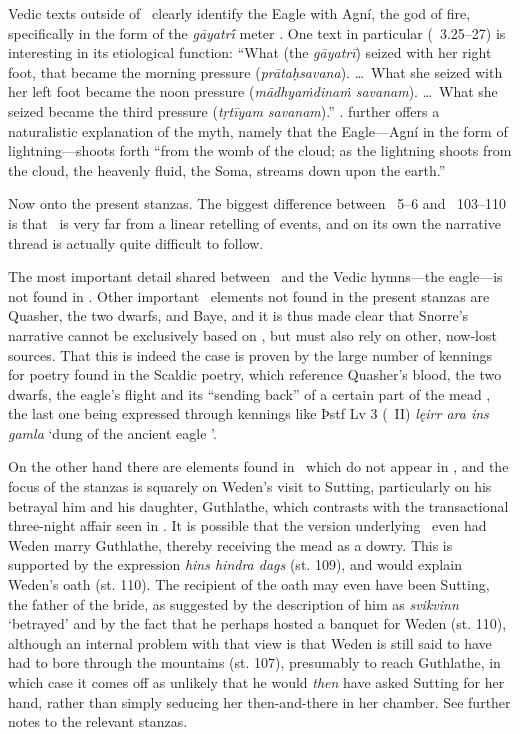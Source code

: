 Vedic texts outside of \Rigveda\ clearly identify the Eagle with Agní, the god of fire, specifically in the form of the \emph{gāyatrī́} meter \parencite{Bloomfield1896}.  One text in particular (\AitareyaBrahmana\ 3.25–27) is interesting in its etiological function: “What (the \emph{gāyatrī}) seized with her right foot, that became the morning pressure (\emph{prātaḥsavana}). \dots\ What she seized with her left foot became the noon pressure (\emph{mādhyaṁdinaṁ savanam}). \dots\ What she seized became the third pressure (\emph{tṛtīyam savanam}).” \parencite[6]{Bloomfield1896}.  \citeauthor{Bloomfield1896} further offers a naturalistic explanation of the myth, namely that the Eagle—Agní in the form of lightning—shoots forth “from the womb of the cloud; as the lightning shoots from the cloud, the heavenly fluid, the Soma, streams down upon the earth.”

Now onto the present stanzas.  The biggest difference between \Skaldskaparmal\ 5–6 and \Havamal\ 103–110 is that \Havamal\ is very far from a linear retelling of events, and on its own the narrative thread is actually quite difficult to follow.

The most important detail shared between \Skaldskaparmal\ and the Vedic hymns—the eagle—is not found in \Havamal.  Other important \Skaldskaparmal\ elements not found in the present stanzas are Quasher, the two dwarfs, and Baye, and it is thus made clear that Snorre’s narrative cannot be exclusively based on \Havamal, but must also rely on other, now-lost sources.  That this is indeed the case is proven by the large number of kennings for poetry found in the Scaldic poetry, which reference Quasher’s blood, the two dwarfs, the eagle’s flight and its “sending back” of a certain part of the mead \parencite[427--430]{Meissner1921}, the last one being expressed through kennings like Þstf Lv 3 (\Skp\ II) \emph{lęirr ara ins gamla} ‘dung of the ancient eagle ’.

On the other hand there are elements found in \Havamal\ which do not appear in \Skaldskaparmal, and the focus of the stanzas is squarely on Weden’s visit to Sutting, particularly on his betrayal him and his daughter, Guthlathe, which contrasts with the transactional three-night affair seen in \Skaldskaparmal.  It is possible that the version underlying \Havamal\ even had Weden marry Guthlathe, thereby receiving the mead as a dowry.  This is supported by the expression \emph{hins hindra dags} (st. 109), and would explain Weden’s oath (st. 110).  The recipient of the oath may even have been Sutting, the father of the bride, as suggested by the description of him as \emph{svikvinn} ‘betrayed’ and by the fact that he perhaps hosted a banquet for Weden (st. 110), although an internal problem with that view is that Weden is still said to have had to bore through the mountains (st. 107), presumably to reach Guthlathe, in which case it comes off as unlikely that he would \emph{then} have asked Sutting for her hand, rather than simply seducing her then-and-there in her chamber.  See further notes to the relevant stanzas.

